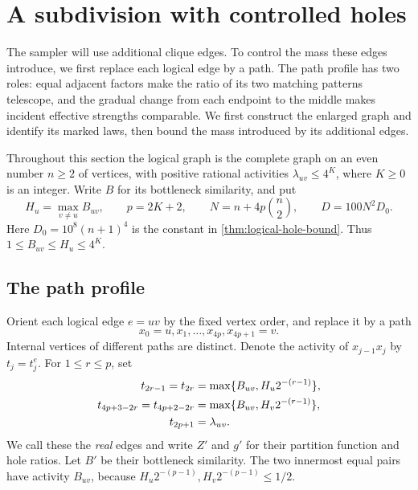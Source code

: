 \documentclass[11pt]{article}
\theoremstyle{definition}
\theoremstyle{remark}
\numberwithin{equation}{section}
\begin{document}
\section{A subdivision with controlled holes}
\label{sec:enlargement}

The sampler will use additional clique edges. To control the mass these
edges introduce, we first replace each logical edge by a path. The
path profile has two roles: equal adjacent factors make the ratio of
its two matching patterns telescope, and the gradual change from each
endpoint to the middle makes incident effective strengths comparable.
We first construct the enlarged graph and identify its marked laws,
then bound the mass introduced by its additional edges.

Throughout this section the logical graph is the complete graph on an
even number $n\ge2$ of vertices, with positive rational activities
$\lambda_{uv}\le4^K$, where $K\ge0$ is an integer. Write
$B$ for its bottleneck similarity, and put
\begin{equation}\label{eq:enlargement-parameters}
 H_u=\max_{v\ne u}B_{uv},\qquad
 p=2K+2,\qquad
 N=n+4p\binom n2,\qquad D=100N^2D_0.
\end{equation}
Here $D_0=10^8(n+1)^4$ is the constant in
\cref{thm:logical-hole-bound}. Thus $1\le B_{uv}\le H_u\le4^K$.

\subsection{The path profile}

Orient each logical edge $e=uv$ by the fixed vertex order, and replace
it by a path
\[
 x_0=u,x_1,\ldots,x_{4p},x_{4p+1}=v.
\]
Internal vertices of different paths are distinct. Denote the activity
of $x_{j-1}x_j$ by $t_j=t_j^e$. For $1\le r\le p$, set
\begin{align}
 t_{2r-1}=t_{2r}
   &=\max\{B_{uv},H_u2^{-(r-1)}\},\notag\\
 t_{4p+3-2r}=t_{4p+2-2r}
   &=\max\{B_{uv},H_v2^{-(r-1)}\},\label{eq:path-profile}\\
 t_{2p+1}&=\lambda_{uv}.\notag
\end{align}
We call these the \emph{real} edges and write $Z'$ and $g'$ for their
partition function and hole ratios. Let $B'$ be their bottleneck
similarity. The two innermost equal pairs have activity $B_{uv}$,
because $H_u2^{-(p-1)},H_v2^{-(p-1)}\le1/2$.
\end{document}
